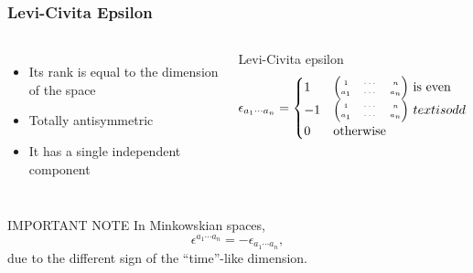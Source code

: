 \begin{frame}
  \frametitle{Levi-Civita Epsilon}
  \begin{columns}[t]
  \begin{itemize}
  \item Its rank is equal to the dimension of the space
  \item Totally antisymmetric
  \item It has a single independent component
  \end{itemize}
  \begin{definition}{Levi-Civita epsilon}
    \begin{align*}
      \epsilon_{a_1 \cdots a_n} =
      \begin{cases}
        1 & 
        {\tiny \begin{pmatrix}
          1&\cdots&n\\
          a_1& \cdots& a_n
        \end{pmatrix}}
        \text{ is even}\\
        -1 & 
        {\tiny \begin{pmatrix}
          1&\cdots&n\\
          a_1& \cdots& a_n
        \end{pmatrix}}\
        text{ is odd}\\
        0 & \text{otherwise}
      \end{cases}
    \end{align*}
  \end{definition}
  \end{columns}
  \begin{alertblock}{IMPORTANT NOTE}
    In Minkowskian spaces, $$\epsilon^{a_1 \cdots a_n}=-\epsilon_{a_1 \cdots a_n},$$due to the different sign of the ``time''-like dimension.
  \end{alertblock}
\end{frame}


